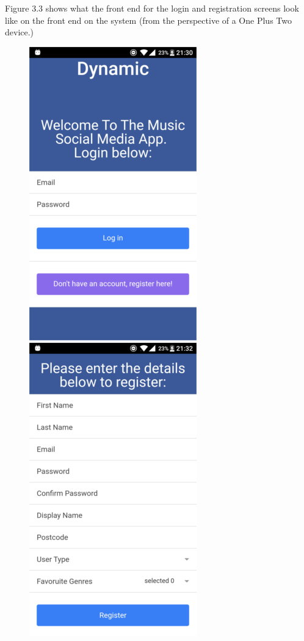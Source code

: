 Figure 3.3 shows what the front end for the login and registration screens look like on the front end on the system (from the perspective of a One Plus Two device.)

\begin{figure}[H]
\includegraphics[scale=0.5]{images/sc1}
\includegraphics[scale=0.5]{images/sc2}

\end{figure}
